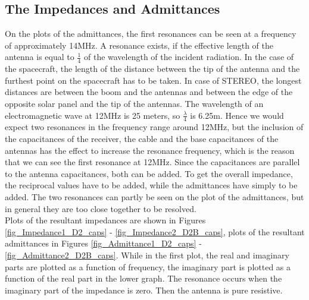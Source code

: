 \documentclass[a4paper,14pt]{extbook}
\begin{document}
\subsection{The Impedances and Admittances}

On the plots of the admittances, the first resonances can be seen
at a frequency of approximately 14MHz. A resonance exists, if the
effective length of the antenna is equal to $\frac{1}{4}$ of the
wavelength of the incident radiation. In the case of the
spacecraft, the length of the distance between the tip of the
antenna and the furthest point on the spacecraft has to be taken.
In case of STEREO, the longest distances are between the boom and
the antennas and between the edge of the opposite solar panel and
the tip of the antennas. The wavelength of an
electromagnetic wave at 12MHz is 25 meters, so $\frac{\lambda}{4}$
is 6.25m. Hence we would expect two resonances in
the frequency range around 12MHz, but the inclusion of the capacitances of the receiver, the cable and the base capacitances of the antennas has the effect to increase the resonance frequency, which is the reason that we can see the first resonance at 12MHz. Since the capacitances are parallel to the antenna capacitances, both can be added. To get the overall impedance, the reciprocal values have to be added, while the admittances have simply to be added. The two resonances can partly be seen on the plot of the admittances, but in general they are too close together to be resolved.\\


 Plots of the resultant impedances are shown in Figures \ref{fig_Impedance1_D2_caps} - \ref{fig_Impedance2_D2B_caps}, plots of the resultant admittances in Figures \ref{fig_Admittance1_D2_caps} - \ref{fig_Admittance2_D2B_caps}. While in the first plot, the real and imaginary parts are plotted as a function of frequency, the imaginary part is plotted as a function of the real part in the lower graph. The resonance occurs when the imaginary part of the impedance is zero. Then the antenna is pure resistive.
\end{document}

